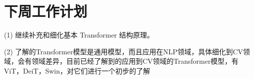 \documentclass[letterpaper,10pt]{article}
\begin{document}
	
	\section{下周工作计划}
	
	(1) 继续补充和细化基本 Transformer 结构原理。
	
	(2) 了解的Transformer模型是通用模型，而且应用在NLP领域，具体细化到CV领域，会有领域差异，目前已经了解到的应用到CV领域的Transformer模型，有ViT，DeiT，Swin，对它们进行一个初步的了解
	
	
	
\end{document}
